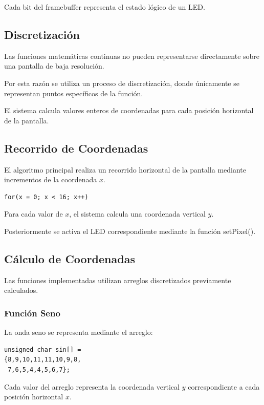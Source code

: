 Cada bit del framebuffer representa el estado lógico de un LED.

\subsection{Discretización}

Las funciones matemáticas continuas no pueden representarse directamente sobre una pantalla de baja resolución.

Por esta razón se utiliza un proceso de discretización, donde únicamente se representan puntos específicos de la función.

El sistema calcula valores enteros de coordenadas para cada posición horizontal de la pantalla.

\subsection{Recorrido de Coordenadas}

El algoritmo principal realiza un recorrido horizontal de la pantalla mediante incrementos de la coordenada \(x\).

\begin{verbatim}
for(x = 0; x < 16; x++)
\end{verbatim}

Para cada valor de \(x\), el sistema calcula una coordenada vertical \(y\).

Posteriormente se activa el LED correspondiente mediante la función setPixel().

\subsection{Cálculo de Coordenadas}

Las funciones implementadas utilizan arreglos discretizados previamente calculados.

\subsubsection{Función Seno}

La onda seno se representa mediante el arreglo:

\begin{verbatim}
unsigned char sin[] =
{8,9,10,11,11,10,9,8,
 7,6,5,4,4,5,6,7};
\end{verbatim}

Cada valor del arreglo representa la coordenada vertical \(y\) correspondiente a cada posición horizontal \(x\).

